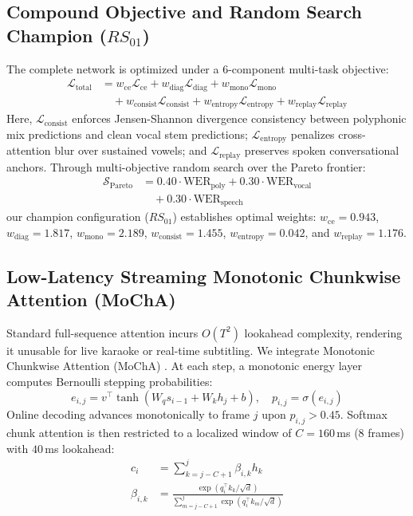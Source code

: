\subsection{Compound Objective and Random Search Champion \texorpdfstring{($RS_{01}$)}{(RS01)}}
The complete network is optimized under a 6-component multi-task objective:
\begin{equation}
\begin{aligned}
\mathcal{L}_{\text{total}} &= w_{\text{ce}} \mathcal{L}_{\text{ce}} + w_{\text{diag}} \mathcal{L}_{\text{diag}} + w_{\text{mono}} \mathcal{L}_{\text{mono}} \\
&\quad + w_{\text{consist}} \mathcal{L}_{\text{consist}} + w_{\text{entropy}} \mathcal{L}_{\text{entropy}} + w_{\text{replay}} \mathcal{L}_{\text{replay}}
\end{aligned}
\end{equation}
Here, $\mathcal{L}_{\text{consist}}$ enforces Jensen-Shannon divergence consistency between polyphonic mix predictions and clean vocal stem predictions; $\mathcal{L}_{\text{entropy}}$ penalizes cross-attention blur over sustained vowels; and $\mathcal{L}_{\text{replay}}$ preserves spoken conversational anchors. Through multi-objective random search over the Pareto frontier:
\begin{equation}
\begin{aligned}
\mathcal{S}_{\text{Pareto}} &= 0.40 \cdot \text{WER}_{\text{poly}} + 0.30 \cdot \text{WER}_{\text{vocal}} \\
&\quad + 0.30 \cdot \text{WER}_{\text{speech}}
\end{aligned}
\end{equation}
our champion configuration ($RS_{01}$) establishes optimal weights: $w_{\text{ce}} = 0.943$, $w_{\text{diag}} = 1.817$, $w_{\text{mono}} = 2.189$, $w_{\text{consist}} = 1.455$, $w_{\text{entropy}} = 0.042$, and $w_{\text{replay}} = 1.176$.

\subsection{Low-Latency Streaming Monotonic Chunkwise Attention (MoChA)}
Standard full-sequence attention incurs $O(T^2)$ lookahead complexity, rendering it unusable for live karaoke or real-time subtitling. We integrate Monotonic Chunkwise Attention (MoChA) \cite{chiu2018monotonic}. At each step, a monotonic energy layer computes Bernoulli stepping probabilities:
\begin{equation}
e_{i, j} = v^\top \tanh(W_q s_{i-1} + W_k h_j + b), \quad p_{i, j} = \sigma(e_{i, j})
\end{equation}
Online decoding advances monotonically to frame $j$ upon $p_{i, j} > 0.45$. Softmax chunk attention is then restricted to a localized window of $C = 160$\,ms ($8$ frames) with $40$\,ms lookahead:
\begin{equation}
\begin{aligned}
c_i &= \sum_{k=j-C+1}^j \beta_{i, k} h_k \\
\beta_{i, k} &= \frac{\exp(q_i^\top k_k / \sqrt{d})}{\sum_{m=j-C+1}^j \exp(q_i^\top k_m / \sqrt{d})}
\end{aligned}
\end{equation}

